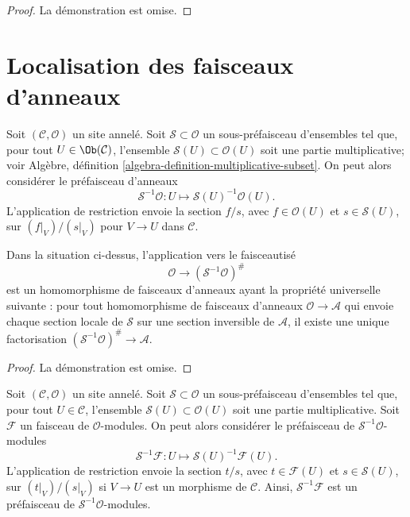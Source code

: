 \begin{proof}
La démonstration est omise.
\end{proof}











\section{Localisation des faisceaux d'anneaux}
\label{section-localizing-sheaves-rings}

\noindent
Soit $(\mathcal{C}, \mathcal{O})$ un site annelé. Soit
$\mathcal{S} \subset \mathcal{O}$ un sous-préfaisceau d'ensembles tel que,
pour tout $U \in \Ob(\mathcal{C})$, l'ensemble
$\mathcal{S}(U) \subset \mathcal{O}(U)$ soit une partie multiplicative; voir
Algèbre, définition \ref{algebra-definition-multiplicative-subset}. On peut
alors considérer le préfaisceau d'anneaux
$$
\mathcal{S}^{-1}\mathcal{O} :
U \longmapsto \mathcal{S}(U)^{-1}\mathcal{O}(U).
$$
L'application de restriction envoie la section $f/s$, avec
$f \in \mathcal{O}(U)$ et $s \in \mathcal{S}(U)$, sur
$(f|_V)/(s|_V)$ pour $V \to U$ dans $\mathcal{C}$.

\begin{lemma}
\label{lemma-simple-invert}
Dans la situation ci-dessus, l'application vers le faisceautisé
$$
\mathcal{O} \longrightarrow (\mathcal{S}^{-1}\mathcal{O})^\#
$$
est un homomorphisme de faisceaux d'anneaux ayant la propriété universelle
suivante : pour tout homomorphisme de faisceaux d'anneaux
$\mathcal{O} \to \mathcal{A}$ qui envoie chaque section locale de
$\mathcal{S}$ sur une section inversible de $\mathcal{A}$, il existe une
unique factorisation $(\mathcal{S}^{-1}\mathcal{O})^\# \to \mathcal{A}$.
\end{lemma}

\begin{proof}
La démonstration est omise.
\end{proof}

\noindent
Soit $(\mathcal{C}, \mathcal{O})$ un site annelé. Soit
$\mathcal{S} \subset \mathcal{O}$ un sous-préfaisceau d'ensembles tel que,
pour tout $U \in \mathcal{C}$, l'ensemble
$\mathcal{S}(U) \subset \mathcal{O}(U)$ soit une partie multiplicative. Soit
$\mathcal{F}$ un faisceau de $\mathcal{O}$-modules. On peut alors considérer
le préfaisceau de $\mathcal{S}^{-1}\mathcal{O}$-modules
$$
\mathcal{S}^{-1}\mathcal{F} :
U \longmapsto \mathcal{S}(U)^{-1}\mathcal{F}(U).
$$
L'application de restriction envoie la section $t/s$, avec
$t \in \mathcal{F}(U)$ et $s \in \mathcal{S}(U)$, sur
$(t|_V)/(s|_V)$ si $V \to U$ est un morphisme de $\mathcal{C}$. Ainsi,
$\mathcal{S}^{-1}\mathcal{F}$ est un préfaisceau de
$\mathcal{S}^{-1}\mathcal{O}$-modules.

